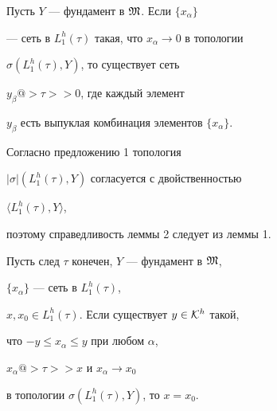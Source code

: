 \begin{lem}


Пусть $Y$ --- фундамент в $\frak M$. Если $\{x_{\alpha}\}$


--- сеть в $L_1^h (\tau)$ такая, что $x_{\alpha} \to 0$ в топологии 


$\sigma (L_1^h (\tau), Y)$, то существует сеть 


$y_{\beta}@>{\tau}>> 0$, где каждый элемент


$y_{\beta}$ есть выпуклая комбинация элементов $\{x_{\alpha}\}$.


\end{lem}





\begin{pf}


Согласно предложению 1 топология 


$| \sigma |(L_1^h (\tau), Y)$ согласуется с двойственностью 


$\langle L_1^h (\tau), Y \rangle$, 


поэтому справедливость леммы 2 следует из леммы 1.


\end{pf}





\begin{lem}


Пусть след $\tau $ конечен, $Y$ --- фундамент в $\frak M$, 


$\{x_{\alpha}\}$ --- сеть в $L_1^h (\tau)$, 


$x, x_0 \in L_1^h (\tau)$. Если существует $y \in {\cal K}^h$ такой, 


что $-y \le x_{\alpha} \le y$ при любом ${\alpha}$, 


$x_{\alpha}@>{\tau}>> x$ и $x_{\alpha} \to x_0$ 


в топологии $\sigma (L_1^h (\tau), Y)$, то $x=x_0$.


\end{lem}





